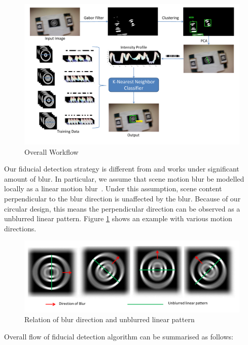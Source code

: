 \documentclass[runningheads]{llncs}
\begin{document}
\begin{figure}
\includegraphics[width=\linewidth]{overall_flow.pdf}
\caption{Overall Workflow}
\end{figure}
Our fiducial detection strategy is different from \cite{NaimarkF02,Pitag13} and works
under significant amount of blur.   In particular, we assume that scene motion 
blur be modelled locally as a linear motion blur~\cite{}.  Under this assumption,
scene content perpendicular to the blur direction is unaffected by the blur.  Because
of our circular design, this means the perpendicular direction can be observed as a 
unblurred linear pattern.  Figure \ref{fig:blur_direction} shows an example with
various motion directions.

\begin{figure}
\centering
\includegraphics[width=\linewidth]{blur_direction.pdf}
\caption{Relation of blur direction and unblurred linear pattern}
\label{fig:blur_direction}
\end{figure}

Overall flow of fiducial detection algorithm can be summarised as follows:
\end{document}
